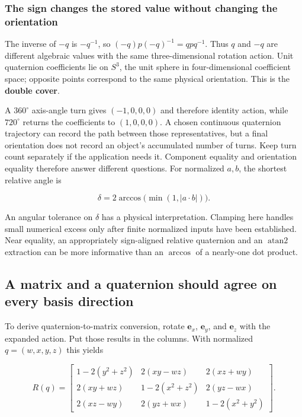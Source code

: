 \subsubsection{The sign changes the stored value without changing the orientation}\label{the-sign-changes-the-stored-value-without-changing-the-orientation}

The inverse of \(-q\) is \(-q^{-1}\), so \((-q)p(-q)^{-1}=qpq^{-1}\). Thus \(q\) and \(-q\) are different algebraic values with the same three-dimensional rotation action. Unit quaternion coefficients lie on \(S^3\), the unit sphere in four-dimensional coefficient space; opposite points correspond to the same physical orientation. This is the \textbf{double cover}.

A \(360^\circ\) axis-angle turn gives \((-1,0,0,0)\) and therefore identity action, while \(720^\circ\) returns the coefficients to \((1,0,0,0)\). A chosen continuous quaternion trajectory can record the path between those representatives, but a final orientation does not record an object's accumulated number of turns. Keep turn count separately if the application needs it. Component equality and orientation equality therefore answer different questions. For normalized \(a,b\), the shortest relative angle is

\[
\delta=2\arccos\bigl(\min(1,|a\cdot b|)\bigr).
\]

An angular tolerance on \(\delta\) has a physical interpretation. Clamping here handles small numerical excess only after finite normalized inputs have been established. Near equality, an appropriately sign-aligned relative quaternion and an \(\operatorname{atan2}\) extraction can be more informative than an \(\arccos\) of a nearly-one dot product.

\subsection{A matrix and a quaternion should agree on every basis direction}\label{a-matrix-and-a-quaternion-should-agree-on-every-basis-direction}

To derive quaternion-to-matrix conversion, rotate \(\mathbf e_x\), \(\mathbf e_y\), and \(\mathbf e_z\) with the expanded action. Put those results in the columns. With normalized \(q=(w,x,y,z)\) this yields

\[
R(q)=\begin{bmatrix}
1-2(y^2+z^2)&2(xy-wz)&2(xz+wy)\\
2(xy+wz)&1-2(x^2+z^2)&2(yz-wx)\\
2(xz-wy)&2(yz+wx)&1-2(x^2+y^2)
\end{bmatrix}.
\]

